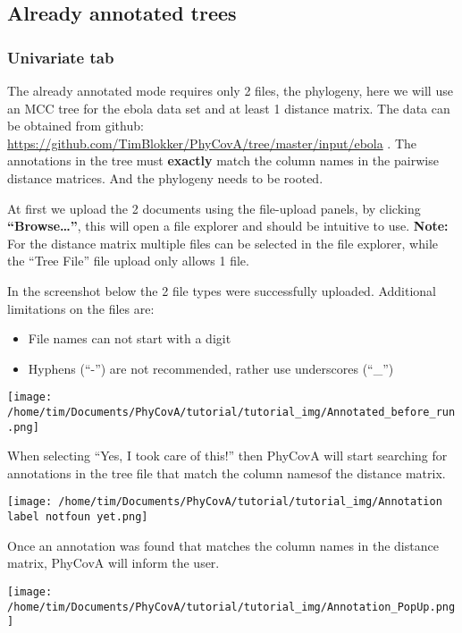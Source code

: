 \documentclass[
]{article}
\begin{document}
\hypertarget{already-annotated-trees}{%
\subsection{Already annotated trees}\label{already-annotated-trees}}

\hypertarget{univariate-tab}{%
\subsubsection{Univariate tab}\label{univariate-tab}}

The already annotated mode requires only 2 files, the phylogeny, here we
will use an MCC tree for the ebola data set and at least 1 distance
matrix. The data can be obtained from github:
\url{https://github.com/TimBlokker/PhyCovA/tree/master/input/ebola} .
The annotations in the tree must \textbf{exactly} match the column names
in the pairwise distance matrices. And the phylogeny needs to be rooted.

At first we upload the 2 documents using the file-upload panels, by
clicking \textbf{``Browse\ldots{}''}, this will open a file explorer and
should be intuitive to use. \textbf{Note:} For the distance matrix
multiple files can be selected in the file explorer, while the ``Tree
File'' file upload only allows 1 file.

In the screenshot below the 2 file types were successfully uploaded.
Additional limitations on the files are:

\begin{itemize}
\item
  File names can not start with a digit
\item
  Hyphens (``-'') are not recommended, rather use underscores (``\_'')
\end{itemize}

\texttt{[image: /home/tim/Documents/PhyCovA/tutorial/tutorial\_img/Annotated\_before\_run.png]}

When selecting ``Yes, I took care of this!'' then PhyCovA will start
searching for annotations in the tree file that match the column namesof
the distance matrix.

\texttt{[image: /home/tim/Documents/PhyCovA/tutorial/tutorial\_img/Annotation label notfoun yet.png]}

Once an annotation was found that matches the column names in the
distance matrix, PhyCovA will inform the user.

\texttt{[image: /home/tim/Documents/PhyCovA/tutorial/tutorial\_img/Annotation\_PopUp.png]}
\end{document}
